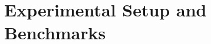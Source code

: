 \documentclass{article}
\begin{document}




\section{Experimental Setup and Benchmarks}
\label{sec:experiments}
\end{document}

